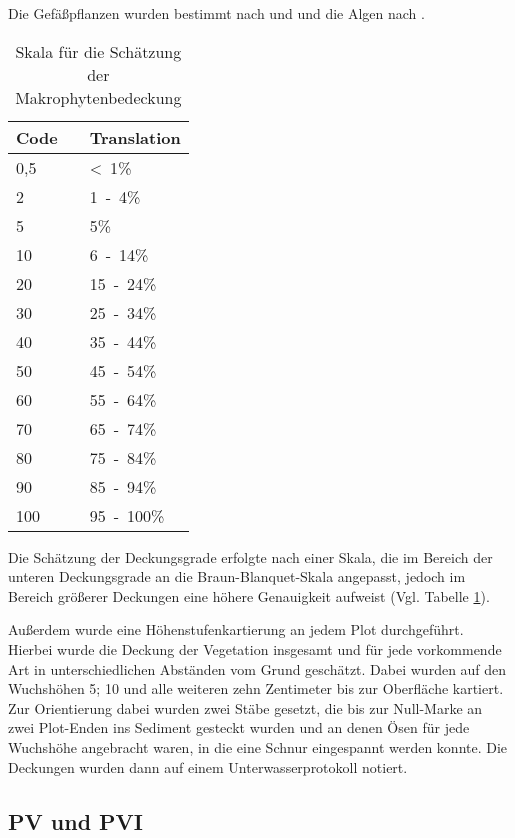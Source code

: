 Die Gefäßpflanzen wurden bestimmt nach \cite{van_de_weyer_2007} und \cite{rothmaler_2005} und die Algen nach \cite{pankow_1971}.


\begin{table}[h]
\centering
\caption{Skala für die Schätzung der Makrophytenbedeckung}
\begin{tabular}{lll}
\toprule
Code	&& Translation\\
\midrule
0,5	 	&& \unit{<1}{\%} \\
2 		&& \unit{1-4}{\%} \\
5 		&& \unit{5}{\%}\\
\midrule
10 		&& \unit{6-14}{\%}\\
20 		&& \unit{15-24}{\%}\\
30 		&& \unit{25-34}{\%}\\
40		&& \unit{35-44}{\%}\\
50		&& \unit{45-54}{\%}\\
\midrule
60		&& \unit{55-64}{\%}\\
70		&& \unit{65-74}{\%}\\
80		&& \unit{75-84}{\%}\\
90		&& \unit{85-94}{\%}\\
100		&& \unit{95-100}{\%}\\
\bottomrule
\end{tabular}
\label{Deckung}
\end{table}



Die Schätzung der Deckungsgrade erfolgte nach einer Skala, die im Bereich der unteren Deckungsgrade an die Braun-Blanquet-Skala angepasst, jedoch im Bereich größerer Deckungen eine höhere Genauigkeit aufweist (Vgl. Tabelle \ref{Deckung}).

Außerdem wurde eine Höhenstufenkartierung an jedem Plot durchgeführt. Hierbei wurde die Deckung der Vegetation insgesamt und für jede vorkommende Art in unterschiedlichen Abständen vom Grund geschätzt. Dabei wurden auf den Wuchshöhen \unit{5}{\centi\metre}; \unit{10}{\centi\metre} und alle weiteren zehn Zentimeter bis zur Oberfläche kartiert. Zur Orientierung dabei wurden zwei Stäbe gesetzt, die bis zur Null-Marke an zwei Plot-Enden ins Sediment gesteckt wurden und an denen Ösen für jede Wuchshöhe angebracht waren, in die eine Schnur eingespannt werden konnte. Die Deckungen wurden dann auf einem Unterwasserprotokoll notiert.






\subsection{PV und PVI}

